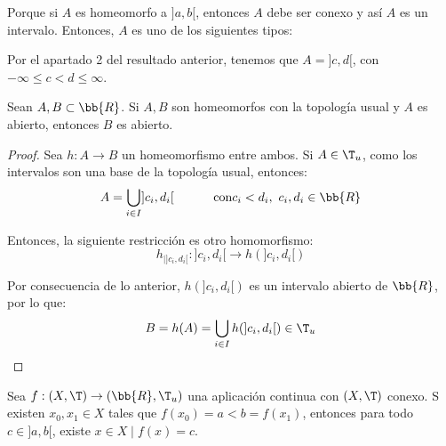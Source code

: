 Porque si $A$ es homeomorfo a $]a,b[$, entonces $A$ debe ser conexo y así $A$ es un intervalo. Entonces, $A$ es uno de los siguientes tipos:
\begin{comment}
\begin{equation*}
    \begin{array}{cc}
        ]c,d[ & -\infty \leq c<d\leq \infty\\
        [c,d[ & -\infty < c<d\leq \infty \\
        ]c,d] & -\infty \leq c<d< \infty \\
        [c,d] & -\infty < c<d< \infty
    \end{array}
\end{equation*}
\end{comment}
Por el apartado 2 del resultado anterior, tenemos que $A=]c,d[$, con $-\infty \leq c<d\leq \infty$.


\begin{teo}
    Sean $A,B\subset \bb{R}$. Si $A,B$ son homeomorfos con la topología usual y $A$ es abierto, entonces $B$ es abierto.
\end{teo}
\begin{proof}
    Sea $h:A\to B$ un homeomorfismo entre ambos. Si $A\in \T_u$, como los intervalos son una base de la topología usual, entonces:
    \begin{equation*}
        A=\bigcup_{i\in I} ]c_i, d_i[ \text{\hspace{1cm} con} c_i<d_i,~ c_i,d_i\in \bb{R}
    \end{equation*}

    Entonces, la siguiente restricción es otro homomorfismo:
    \begin{equation*}
        h_{\big | ]c_i,d_i[}:]c_i,d_i[\to h(]c_i,d_i[)
    \end{equation*}

    Por consecuencia de lo anterior, $h(]c_i,d_i[)$ es un intervalo abierto de $\bb{R}$, por lo que:
    \begin{equation*}
        B=h(A)=\bigcup_{i\in I} h(]c_i,d_i[)\in \T_u
    \end{equation*}
\end{proof}


\begin{teo}
    Sea $f:(X,\T)\to (\bb{R}, \T_u)$ una aplicación continua con $(X,\T)$ conexo. S existen $x_0,x_1\in X$ tales que $f(x_0)=a<b=f(x_1)$, entonces para todo $c\in ]a,b[$, existe $x\in X\mid f(x)=c$.
\end{teo}


